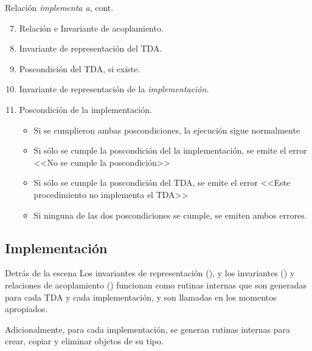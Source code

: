 \begin{frame}{Relación \textit{implementa a}, cont.}
\begin{enumerate}\setcounter{enumi}{6}
  \item Relación e Invariante de acoplamiento.

  \item Invariante de representación del TDA.

  \item Poscondición del TDA, si existe.

  \item Invariante de representación de la \textit{implementación}.

  \item Poscondición de la implementación.
    \begin{itemize}
      \item Si se cumplieron ambas poscondiciones, la ejecución sigue normalmente
      \item Si sólo se cumple la poscondición del la implementación, se emite el
      error <<No se cumple la poscondición>>
      \item Si sólo se cumple la poscondición del TDA, se emite el error <<Este
      procedimiento no implementa el TDA>>
      \item Si ninguna de las dos poscondiciones se cumple, se emiten ambos errores.
    \end{itemize}
\end{enumerate}
\end{frame}

\subsection*{Implementación}

\begin{frame}{Detrás de la escena}
Los invariantes de representación (), y los invariantes  () y relaciones de acoplamiento () funcionan como rutinas internas que son generadas para cada TDA y cada implementación, y son llamadas en los momentos apropiados. 

Adicionalmente, para cada implementación, se generan rutinas internas para crear, copiar y eliminar objetos de su tipo. 
\end{frame}

